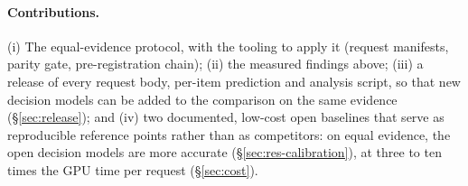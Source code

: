 \paragraph{Contributions.} (i) The equal-evidence protocol, with the tooling to apply it (request manifests,
parity gate, pre-registration chain); (ii) the measured findings above; (iii) a release of every request body,
per-item prediction and analysis script, so that new decision models can be added to the comparison on the same
evidence (\S\ref{sec:release}); and (iv) two documented, low-cost open baselines that serve as reproducible
reference points rather than as competitors: on equal evidence, the open decision models are more accurate
(\S\ref{sec:res-calibration}), at three to ten times the GPU time per request (\S\ref{sec:cost}).
